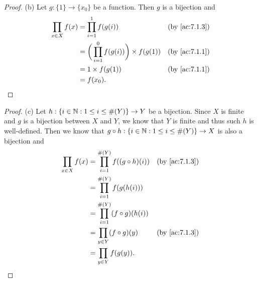 \begin{proof}{(b)}
  Let \(g : \{1\} \to \{x_0\}\) be a function.
  Then \(g\) is a bijection and
  \begin{align*}
    \prod_{x \in X} f(x) & = \prod_{i = 1}^1 f(g(i))                            & \text{(by \cref{ac:7.1.3})} \\
                         & = \bigg(\prod_{i = 1}^0 f(g(i))\bigg) \times f(g(1)) & \text{(by \cref{ac:7.1.1})} \\
                         & = 1 \times f(g(1))                                   & \text{(by \cref{ac:7.1.1})} \\
                         & = f(x_0).
  \end{align*}
\end{proof}

\begin{proof}{(c)}
  Let \(h : \{i \in \mathbb{N} : 1 \leq i \leq \#(Y)\} \to Y\) be a bijection.
  Since \(X\) is finite and \(g\) is a bijection between \(X\) and \(Y\), we know that \(Y\) is finite and thus such \(h\) is well-defined.
  Then we know that \(g \circ h : \{i \in \mathbb{N} : 1 \leq i \leq \#(Y)\} \to X\) is also a bijection and
  \begin{align*}
    \prod_{x \in X} f(x) & = \prod_{i = 1}^{\#(Y)} f((g \circ h)(i)) & \text{(by \cref{ac:7.1.3})} \\
                         & = \prod_{i = 1}^{\#(Y)} f(g(h(i)))                                      \\
                         & = \prod_{i = 1}^{\#(Y)} (f \circ g)(h(i))                               \\
                         & = \prod_{y \in Y} (f \circ g)(y)          & \text{(by \cref{ac:7.1.3})} \\
                         & = \prod_{y \in Y} f(g(y)).
  \end{align*}
\end{proof}

